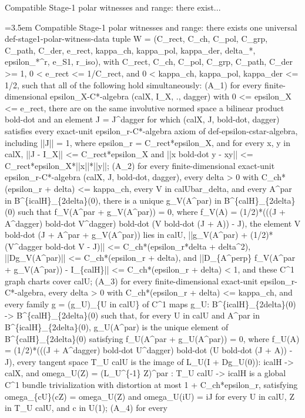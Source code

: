 \documentclass{article}
\newcommand{\step}[1]{\par\noindent\hangindent=3.5em\hangafter=1%
  \makebox[3.5em][l]{\textbf{#1.}}}
\begin{document}
\begin{proofbox}{Compatible Stage-1 polar witnesses and range: there exist...}
\step{1} Compatible Stage-1 polar witnesses and range: there exists one universal def-stage1-polar-witness-data tuple W = (C\_rect, C\_ch, C\_pol, C\_grp, C\_path, C\_der, e\_rect, kappa\_ch, kappa\_pol, kappa\_der, delta\_*, epsilon\_*\textasciicircum{}r, e\_S1, r\_iso), with C\_rect, C\_ch, C\_pol, C\_grp, C\_path, C\_der >= 1, 0 < e\_rect <= 1/C\_rect, and 0 < kappa\_ch, kappa\_pol, kappa\_der <= 1/2, such that all of the following hold simultaneously: (A\_1) for every finite-dimensional epsilon\_X-C*-algebra (calX, I\_X, ., dagger) with 0 <= epsilon\_X <= e\_rect, there are on the same involutive normed space a bilinear product bold-dot and an element J = J\textasciicircum{}dagger for which (calX, J, bold-dot, dagger) satisfies every exact-unit epsilon\_r-C*-algebra axiom of def-epsilon-cstar-algebra, including ||J|| = 1, where epsilon\_r = C\_rect*epsilon\_X, and for every x, y in calX, ||J - I\_X|| <= C\_rect*epsilon\_X and ||x bold-dot y - xy|| <= C\_rect*epsilon\_X*||x||*||y||; (A\_2) for every finite-dimensional exact-unit epsilon\_r-C*-algebra (calX, J, bold-dot, dagger), every delta > 0 with C\_ch*(epsilon\_r + delta) <= kappa\_ch, every V in calUbar\_delta, and every A\textasciicircum{}par in B\textasciicircum{}\{icalH\}\_\{2delta\}(0), there is a unique g\_V(A\textasciicircum{}par) in B\textasciicircum{}\{calH\}\_\{2delta\}(0) such that f\_V(A\textasciicircum{}par + g\_V(A\textasciicircum{}par)) = 0, where f\_V(A) = (1/2)*(((J + A\textasciicircum{}dagger) bold-dot V\textasciicircum{}dagger) bold-dot (V bold-dot (J + A)) - J), the element V bold-dot (J + A\textasciicircum{}par + g\_V(A\textasciicircum{}par)) lies in calU, ||g\_V(A\textasciicircum{}par) + (1/2)*(V\textasciicircum{}dagger bold-dot V - J)|| <= C\_ch*(epsilon\_r*delta + delta\textasciicircum{}2), ||Dg\_V(A\textasciicircum{}par)|| <= C\_ch*(epsilon\_r + delta), and ||D\_\{A\textasciicircum{}perp\} f\_V(A\textasciicircum{}par + g\_V(A\textasciicircum{}par)) - I\_\{calH\}|| <= C\_ch*(epsilon\_r + delta) < 1, and these C\textasciicircum{}1 graph charts cover calU; (A\_3) for every finite-dimensional exact-unit epsilon\_r-C*-algebra, every delta > 0 with C\_ch*(epsilon\_r + delta) <= kappa\_ch, and every family g = (g\_U)\_\{U in calU\} of C\textasciicircum{}1 maps g\_U: B\textasciicircum{}\{icalH\}\_\{2delta\}(0) -> B\textasciicircum{}\{calH\}\_\{2delta\}(0) such that, for every U in calU and A\textasciicircum{}par in B\textasciicircum{}\{icalH\}\_\{2delta\}(0), g\_U(A\textasciicircum{}par) is the unique element of B\textasciicircum{}\{calH\}\_\{2delta\}(0) satisfying f\_U(A\textasciicircum{}par + g\_U(A\textasciicircum{}par)) = 0, where f\_U(A) = (1/2)*(((J + A\textasciicircum{}dagger) bold-dot U\textasciicircum{}dagger) bold-dot (U bold-dot (J + A)) - J), every tangent space T\_U calU is the image of L\_U(I + Dg\_U(0)): icalH -> calX, and omega\_U(Z) = (L\_U\textasciicircum{}\{-1\} Z)\textasciicircum{}par : T\_U calU -> icalH is a global C\textasciicircum{}1 bundle trivialization with distortion at most 1 + C\_ch*epsilon\_r, satisfying omega\_\{cU\}(cZ) = omega\_U(Z) and omega\_U(iU) = iJ for every U in calU, Z in T\_U calU, and c in U(1); (A\_4) for every 
\end{proofbox}
\end{document}
